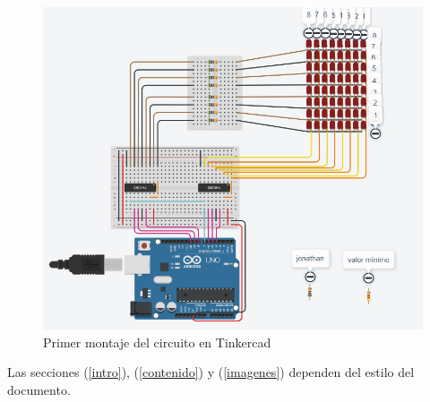 \documentclass{article}
\begin{document}
\begin{figure}[h]
\includegraphics[width=16cm]{montaje1.png}
\centering
\caption{Primer montaje del circuito en Tinkercad}
\label{fig:montaje1}
\end{figure}

Las secciones (\ref{intro}), (\ref{contenido}) y (\ref{imagenes}) dependen del estilo del documento.



\end{document}
